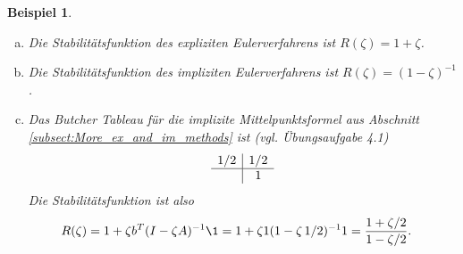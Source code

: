 \documentclass[
]{mycourse}
\theoremstyle{mythm}
\newtheorem{beispiel}[theorem]{Beispiel}
\theoremstyle{break}
\begin{document}
\begin{beispiel}
\begin{enumerate}[(a)]
\item Die Stabilitätsfunktion des expliziten Eulerverfahrens ist
$R(\zeta)=1+\zeta$.
\item Die Stabilitätsfunktion des impliziten Eulerverfahrens ist $R(\zeta)=(1-\zeta )^{-1}$.
\item Das Butcher Tableau für die implizite Mittelpunktsformel aus Abschnitt \ref{subsect:More_ex_and_im_methods} 
ist (vgl. Übungsaufgabe 4.1)
\[
\begin{array}{c | c}
1/2 & 1/2\\ \hline
 & 1
\end{array}
\]
Die Stabilitätsfunktion ist also
\begin{align*}
R(\zeta) &= 1+\zeta b^T (I-\zeta A)^{-1} \1= 1+\zeta 1 (1-\zeta\, 1/2)^{-1} 1
= \frac{1+\zeta/2}{1-\zeta/2}.
\end{align*}

\end{enumerate}
\end{beispiel}
\end{document}
